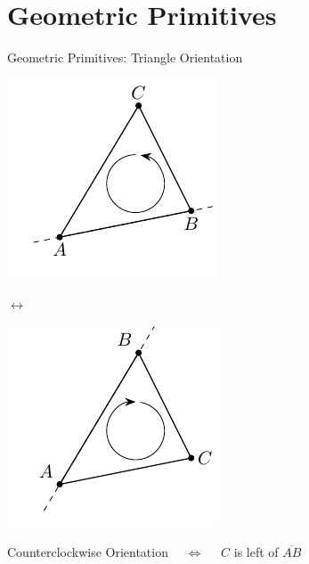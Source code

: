\documentclass[aspectratio=169,fleqn]{beamer}
\begin{document}
\section{Geometric Primitives}
  \begin{frame}{Geometric Primitives: Triangle Orientation}
    \begin{minipage}[c]{0.4\textwidth}
        \centering
        \includegraphics{figures/triangle-counterclockwise.pdf}
    \end{minipage}
    \hfill
    $\longleftrightarrow$
    \hfill
    \begin{minipage}[c]{0.4\textwidth}
        \centering
        \includegraphics{figures/triangle-clockwise.pdf}
    \end{minipage}

    \pause
    Counterclockwise Orientation
    $\quad\iff\quad$ $C$ is left of $\overline{AB}$

    \bigskip


\end{frame}
\end{document}
